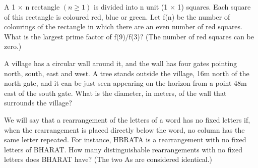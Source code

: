 \item A 1 $\times$ n rectangle $(n \geq 1)$ is divided into n unit (1 $\times$ 1) squares. Each square of this rectangle is coloured red, blue or green. Let f(n) be the number of colourings of the rectangle in which there are an even number of red squares. What is the largest prime factor of f(9)/f(3)? (The number of red squares can be zero.)

\item A village has a circular wall around it, and the wall has four gates pointing north, south, east and west. A tree stands outside the village, 16m north of the north gate, and it can be just seen appearing on the horizon from a point 48m east of the south gate. What is the diameter, in meters, of the wall that surrounds the village?

\item We will say that a rearrangement of the letters of a word has no fixed letters if, when the rearrangement is placed directly below the word, no column has the same letter repeated. For instance, HBRATA is a rearrangement with no fixed letters of BHARAT. How many distinguishable rearrangements with no fixed letters does BHARAT have? (The two As are considered identical.)

